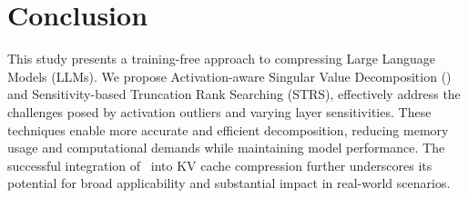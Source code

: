 \section{Conclusion}
This study presents a training-free approach to compressing Large Language Models (LLMs). We propose Activation-aware Singular Value Decomposition (\asvd) and Sensitivity-based Truncation Rank Searching (STRS), effectively address the challenges posed by activation outliers and varying layer sensitivities. 
These techniques enable more accurate and efficient decomposition, reducing memory usage and computational demands while maintaining model performance. The successful integration of \asvd~into KV cache compression further underscores its potential for broad applicability and substantial impact in real-world scenarios.




